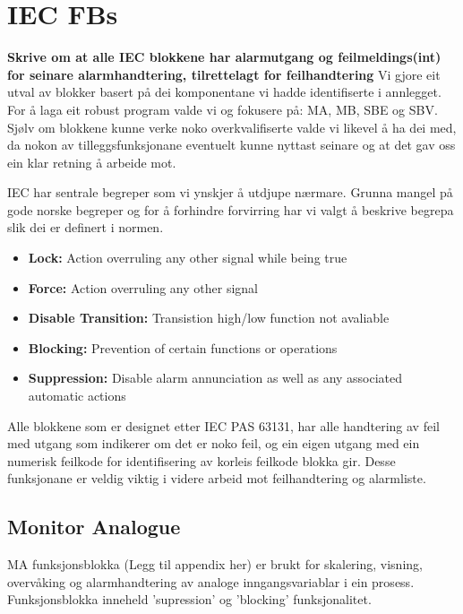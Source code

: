 \section{IEC \glspl{FB}}
\thispagestyle{fancy}





\textbf{Skrive om at alle IEC blokkene har alarmutgang og feilmeldings(int) for seinare alarmhandtering, tilrettelagt for feilhandtering}\newline
Vi gjore eit utval av blokker basert på dei komponentane vi hadde identifiserte i annlegget.
For å laga eit robust program valde vi og fokusere på: \gls{MA}, \gls{MB}, \gls{SBE} og \gls{SBV}.
Sjølv om blokkene kunne verke noko overkvalifiserte valde vi likevel å ha dei med, da nokon av tilleggsfunksjonane eventuelt kunne nyttast seinare
og at det gav oss ein klar retning å arbeide mot.

\gls{IEC} har sentrale begreper som vi ynskjer å utdjupe nærmare. Grunna mangel på gode norske begreper 
og for å forhindre forvirring har vi valgt å beskrive begrepa slik dei er definert i normen.

\begin{itemize}
    \item \textbf{Lock:} Action overruling any other signal while being true
    \item \textbf{Force:} Action overruling any other signal
    \item \textbf{Disable Transition:} Transistion high/low function not avaliable
    \item \textbf{Blocking:} Prevention of certain functions or operations 
    \item \textbf{Suppression:} Disable alarm annunciation as well as any associated automatic actions
\end{itemize}

Alle blokkene som er designet etter IEC PAS 63131, har alle handtering av feil med utgang som indikerer om det er noko feil, og ein eigen utgang med ein numerisk feilkode for identifisering av korleis feilkode blokka gir. 
Desse funksjonane er veldig viktig i videre arbeid mot feilhandtering og alarmliste. 

\subsection{Monitor Analogue}
\gls{MA} funksjonsblokka (Legg til appendix her) er brukt for skalering, visning, overvåking og alarmhandtering av analoge inngangsvariablar i ein prosess.
Funksjonsblokka inneheld 'supression' og 'blocking' funksjonalitet.

